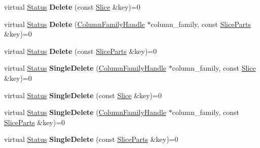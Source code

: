 \begin{DoxyCompactItemize}
\item 
virtual \hyperlink{classrocksdb_1_1Status}{Status} {\bfseries Delete} (const \hyperlink{classrocksdb_1_1Slice}{Slice} \&key)=0\hypertarget{classrocksdb_1_1Transaction_ae001d3cd5b7b576fb88e7c0aee5982bf}{}\label{classrocksdb_1_1Transaction_ae001d3cd5b7b576fb88e7c0aee5982bf}

\item 
virtual \hyperlink{classrocksdb_1_1Status}{Status} {\bfseries Delete} (\hyperlink{classrocksdb_1_1ColumnFamilyHandle}{Column\+Family\+Handle} $\ast$column\+\_\+family, const \hyperlink{structrocksdb_1_1SliceParts}{Slice\+Parts} \&key)=0\hypertarget{classrocksdb_1_1Transaction_a7d7d05954b5389622d40f552aeb1fbc5}{}\label{classrocksdb_1_1Transaction_a7d7d05954b5389622d40f552aeb1fbc5}

\item 
virtual \hyperlink{classrocksdb_1_1Status}{Status} {\bfseries Delete} (const \hyperlink{structrocksdb_1_1SliceParts}{Slice\+Parts} \&key)=0\hypertarget{classrocksdb_1_1Transaction_a0c2774542bb00509fc118ba18a71c0a6}{}\label{classrocksdb_1_1Transaction_a0c2774542bb00509fc118ba18a71c0a6}

\item 
virtual \hyperlink{classrocksdb_1_1Status}{Status} {\bfseries Single\+Delete} (\hyperlink{classrocksdb_1_1ColumnFamilyHandle}{Column\+Family\+Handle} $\ast$column\+\_\+family, const \hyperlink{classrocksdb_1_1Slice}{Slice} \&key)=0\hypertarget{classrocksdb_1_1Transaction_aa660b0f6e7f13516689e0c66d22f63b1}{}\label{classrocksdb_1_1Transaction_aa660b0f6e7f13516689e0c66d22f63b1}

\item 
virtual \hyperlink{classrocksdb_1_1Status}{Status} {\bfseries Single\+Delete} (const \hyperlink{classrocksdb_1_1Slice}{Slice} \&key)=0\hypertarget{classrocksdb_1_1Transaction_a14681d446883a3cc3ace42f15227a0cb}{}\label{classrocksdb_1_1Transaction_a14681d446883a3cc3ace42f15227a0cb}

\item 
virtual \hyperlink{classrocksdb_1_1Status}{Status} {\bfseries Single\+Delete} (\hyperlink{classrocksdb_1_1ColumnFamilyHandle}{Column\+Family\+Handle} $\ast$column\+\_\+family, const \hyperlink{structrocksdb_1_1SliceParts}{Slice\+Parts} \&key)=0\hypertarget{classrocksdb_1_1Transaction_aff7c5310f58ffdb82c4dc19d57d4b50f}{}\label{classrocksdb_1_1Transaction_aff7c5310f58ffdb82c4dc19d57d4b50f}

\item 
virtual \hyperlink{classrocksdb_1_1Status}{Status} {\bfseries Single\+Delete} (const \hyperlink{structrocksdb_1_1SliceParts}{Slice\+Parts} \&key)=0\hypertarget{classrocksdb_1_1Transaction_a403c1c52fa3c5229b60d4df4a7f4a828}{}\label{classrocksdb_1_1Transaction_a403c1c52fa3c5229b60d4df4a7f4a828}


\end{DoxyCompactItemize}
